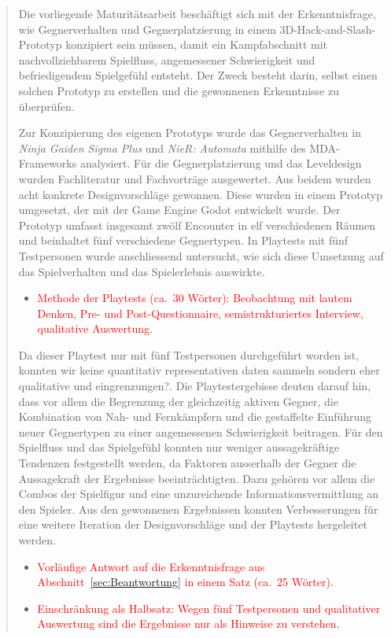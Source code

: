 \documentclass[10pt]{article}
\newcommand{\game}[1]{\textit{#1}}   %
\begin{document}
\begin{abstract}
    Die vorliegende Maturitätsarbeit beschäftigt sich mit der Erkenntnisfrage, wie Gegnerverhalten und Gegnerplatzierung in einem 3D-Hack-and-Slash-Prototyp konzipiert sein müssen, damit ein Kampfabschnitt mit nachvollziehbarem Spielfluss, angemessener Schwierigkeit und befriedigendem Spielgefühl entsteht. Der Zweck besteht darin, selbst einen solchen Prototyp zu erstellen und die gewonnenen Erkenntnisse zu überprüfen.

    Zur Konzipierung des eigenen Prototyps wurde das Gegnerverhalten in \game{Ninja Gaiden Sigma Plus} und \game{NieR: Automata} mithilfe des MDA-Frameworks analysiert. Für die Gegnerplatzierung und das Leveldesign wurden Fachliteratur und Fachvorträge ausgewertet. Aus beidem wurden acht konkrete Designvorschläge gewonnen. Diese wurden in einem Prototyp umgesetzt, der mit der Game Engine Godot entwickelt wurde. Der Prototyp umfasst insgesamt zwölf Encounter in elf verschiedenen Räumen und beinhaltet fünf verschiedene Gegnertypen. In Playtests mit fünf Testpersonen wurde anschliessend untersucht, wie sich diese Umsetzung auf das Spielverhalten und das Spielerlebnis auswirkte.

    \begin{itemize}[nosep, leftmargin=*]
        \item \textcolor{red}{Methode der Playtests (ca.\ 30 Wörter): Beobachtung mit lautem Denken, Pre- und Post-Questionnaire, semistrukturiertes Interview, qualitative Auswertung.}
    \end{itemize}

    Da dieser Playtest nur mit fünf Testpersonen durchgeführt worden ist, konnten wir keine quantitativ representativen daten sammeln sondern eher qualitative und eingrenzungen?. Die Playtestergebisse deuten darauf hin, dass vor allem die Begrenzung der gleichzeitig aktiven Gegner, die Kombination von Nah- und Fernkämpfern und die gestaffelte Einführung neuer Gegnertypen zu einer angemessenen Schwierigkeit beitragen. Für den Spielfluss und das Spielgefühl konnten nur weniger aussagekräftige Tendenzen festgestellt werden, da Faktoren ausserhalb der Gegner die Aussagekraft der Ergebnisse beeinträchtigten. Dazu gehören vor allem die Combos der Spielfigur und eine unzureichende Informationsvermittlung an den Spieler. Aus den gewonnenen Ergebnissen konnten Verbesserungen für eine weitere Iteration der Designvorschläge und der Playtests hergeleitet werden.

    \begin{itemize}[nosep, leftmargin=*]
        \item \textcolor{red}{Vorläufige Antwort auf die Erkenntnisfrage aus Abschnitt~\ref{sec:Beantwortung} in einem Satz (ca.\ 25 Wörter).}
        \item \textcolor{red}{Einschränkung als Halbsatz: Wegen fünf Testpersonen und qualitativer Auswertung sind die Ergebnisse nur als Hinweise zu verstehen.}
    \end{itemize}
\end{abstract}
\end{document}
